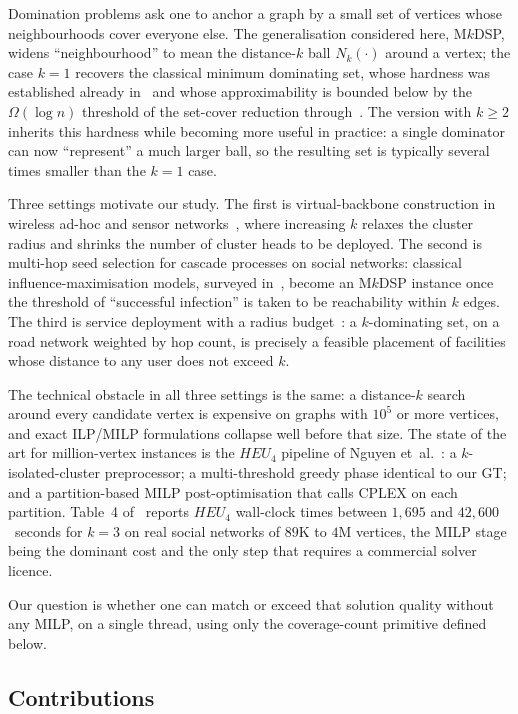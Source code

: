 \documentclass[11pt,a4paper]{article}
\begin{document}
Domination problems ask one to anchor a graph by a small set of
vertices whose neighbourhoods cover everyone else. The generalisation
considered here, M$k$DSP, widens ``neighbourhood'' to mean the
distance-$k$ ball $N_k(\cdot)$ around a vertex; the case $k=1$ recovers
the classical minimum dominating set, whose hardness was established
already in~\cite{garey1979} and whose
approximability is bounded below by the
$\Omega(\log n)$ threshold of the set-cover reduction
through~\cite{raz1997}. The version with $k\ge 2$ inherits this
hardness while becoming more useful in practice: a single dominator
can now ``represent'' a much larger ball, so the resulting set is
typically several times smaller than the $k=1$ case.

Three settings motivate our study. The first is virtual-backbone
construction in wireless ad-hoc and sensor
networks~\cite{amis2000}, where increasing $k$ relaxes the cluster
radius and shrinks the number of cluster heads to be deployed. The
second is multi-hop seed selection for cascade processes on social
networks: classical influence-maximisation models, surveyed
in~\cite{kempe2003}, become an M$k$DSP instance once the threshold of
``successful infection'' is taken to be reachability within $k$
edges. The third is service deployment with a radius
budget~\cite{hassin1991}: a $k$-dominating set, on a road network
weighted by hop count, is precisely a feasible placement of facilities
whose distance to any user does not exceed $k$.

The technical obstacle in all three settings is the same: a
distance-$k$ search around every candidate vertex is expensive on
graphs with $10^5$ or more vertices, and exact ILP/MILP formulations
collapse well before that size. The state of the art for
million-vertex instances is the $\mathit{HEU_4}$ pipeline of
Nguyen et~al.~\cite{nguyen2020}: a $k$-isolated-cluster
preprocessor; a multi-threshold greedy phase identical to our GT; and
a partition-based MILP post-optimisation that calls CPLEX on each
partition. Table~4 of~\cite{nguyen2020} reports
$\mathit{HEU_4}$ wall-clock times between $1{,}695$ and
$42{,}600$~seconds for $k=3$ on real social networks of $89$K to $4$M
vertices, the MILP stage being the dominant cost and the only step
that requires a commercial solver licence.

Our question is whether one can match or exceed that solution
quality without any MILP, on a single thread, using only the
coverage-count primitive defined below.

\subsection{Contributions}
\end{document}
